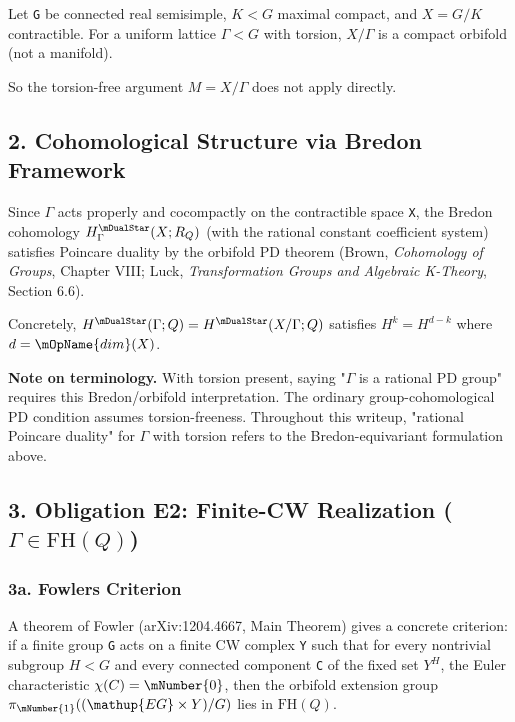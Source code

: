 Let \texttt{G} be connected real semisimple, \(K < G\) maximal compact, and
\(X = G/K\) contractible. For a uniform lattice \(\Gamma < G\) with torsion,
\(X/\Gamma\) is a compact orbifold (not a manifold).

So the torsion-free argument \(M = X/\Gamma\) does not apply directly.

\hypertarget{2-cohomological-structure-via-bredon-framework}{%
\subsection{2. Cohomological Structure via Bredon Framework}\label{2-cohomological-structure-via-bredon-framework}}

Since \(\Gamma\) acts properly and cocompactly on the contractible space \texttt{X},
the Bredon cohomology \(H^{\mDualStar}_\Gamma(X; R_{Q})\) (with the rational constant
coefficient system) satisfies Poincare duality by the orbifold PD theorem
(Brown, \emph{Cohomology of Groups}, Chapter VIII; Luck, \emph{Transformation Groups
and Algebraic K-Theory}, Section 6.6).

Concretely, \(H^{\mDualStar}(\Gamma; Q) = H^{\mDualStar}(X/\Gamma; Q)\) satisfies \(H^{k} = H^{d-k}\)
where \(d = \mOpName{dim}(X)\).

\textbf{Note on terminology.} With torsion present, saying "\(\Gamma\) is a rational
PD group" requires this Bredon/orbifold interpretation. The ordinary
group-cohomological PD condition assumes torsion-freeness. Throughout this
writeup, "rational Poincare duality" for \(\Gamma\) with torsion refers to the
Bredon-equivariant formulation above.

\hypertarget{3-obligation-e2-finite-cw-realization-gamma-in-fhq}{%
\subsection{\texorpdfstring{3. Obligation E2: Finite-CW Realization (\(\Gamma \in \mathup{FH}(Q)\))}{3. Obligation E2: Finite-CW Realization (\textbackslash Gamma \textbackslash in \textbackslash mathup\{FH\}(Q))}}\label{3-obligation-e2-finite-cw-realization-gamma-in-fhq}}

\hypertarget{3a-fowlers-criterion}{%
\subsubsection{3a. Fowler\textquotesingle s Criterion}\label{3a-fowlers-criterion}}

A theorem of Fowler (arXiv:1204.4667, Main Theorem) gives a concrete
criterion: if a finite group \texttt{G} acts on a finite CW complex \texttt{Y} such that
for every nontrivial subgroup \(H < G\) and every connected component \texttt{C} of
the fixed set \(Y^{H}\), the Euler characteristic \(\chi(C) = \mNumber{0}\), then the
orbifold extension group \(\pi_\mNumber{1}((\mathup{EG} \times Y)/G)\) lies in \(\mathup{FH}(Q)\).

